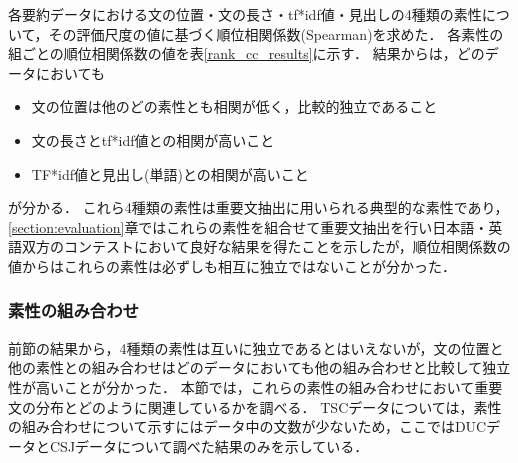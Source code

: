 各要約データにおける文の位置・文の長さ・tf*idf値・見出しの4種類の素性について，その評価尺度の値に基づく順位相関係数(Spearman)を求めた．
各素性の組ごとの順位相関係数の値を表\ref{rank_cc_results}に示す．
結果からは，どのデータにおいても
\begin{itemize}
 \item 文の位置は他のどの素性とも相関が低く，比較的独立であること
 \item 文の長さとtf*idf値との相関が高いこと\footnotemark
 \item TF*idf値と見出し(単語)との相関が高いこと
\end{itemize}
が分かる．
これら4種類の素性は重要文抽出に用いられる典型的な素性であり，\ref{section:evaluation}章ではこれらの素性を組合せて重要文抽出を行い日本語・英語双方のコンテストにおいて良好な結果を得たことを示したが，順位相関係数の値からはこれらの素性は必ずしも相互に独立ではないことが分かった．

\subsubsection{素性の組み合わせ}

前節の結果から，4種類の素性は互いに独立であるとはいえないが，文の位置と他の素性との組み合わせはどのデータにおいても他の組み合わせと比較して独立性が高いことが分かった．
本節では，これらの素性の組み合わせにおいて重要文の分布とどのように関連しているかを調べる．
TSCデータについては，素性の組み合わせについて示すにはデータ中の文数が少ないため，ここではDUCデータとCSJデータについて調べた結果のみを示している．

